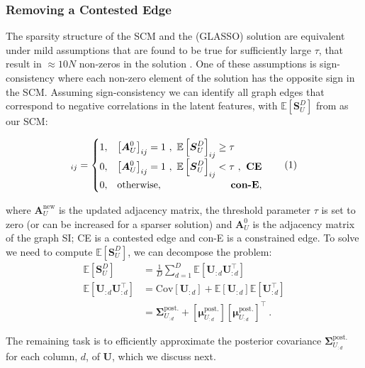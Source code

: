 \documentclass{article}
\theoremstyle{plain}
\theoremstyle{definition}
\theoremstyle{remark}
\newcommand\numberthis{\addtocounter{equation}{1}\tag{\theequation}}
\def\*#1{\boldsymbol{#1}}
\begin{document}
\subsubsection{Removing a Contested Edge}
The sparsity structure of the SCM and the (GLASSO) solution are equivalent under mild assumptions that are found to be true for sufficiently large $\tau$, that result in $\approx 10 N$ non-zeros in the solution \cite{fattahi2017graphical,fattahi2019graphical}. One of these assumptions is sign-consistency where each non-zero element of the solution has the opposite sign in the SCM. Assuming sign-consistency we can identify all graph edges that correspond to negative correlations in the latent features, with $\mathbb{E} [ \*S_U^D ]$ from  as our SCM:


\begin{equation*}
    [\*A_U^{\text{new}}]_{ij} = \begin{cases} 
    1, & \left[\*A_U^0\right]_{ij} = 1 \ , \ \mathbb{E} \left[ \*S_U^D \right]_{ij} \geq \tau \\
    0, & \left[\*A_U^0\right]_{ij} = 1 \ , \ \mathbb{E} \left[ \*S_U^D \right]_{ij} < \tau \ , \hfill \textbf{ CE}\\
    0, & \text{otherwise} , \hfill \textbf{con-E} , 
    \end{cases} \numberthis \label{eq:posCovThesh}
\end{equation*}

where $\*A_U^{\text{new}}$ is the updated adjacency matrix, the threshold parameter $\tau$ is set to zero (or can be increased for a sparser solution) and $\*A_U^0$ is the adjacency matrix of the graph SI; CE is a contested edge and con-E is a constrained edge. To solve  we need to compute $\mathbb{E} [ \*S_U^D ]$, we can decompose the problem:
\begin{align*}
 \mathbb{E}[\*S^{D}_U] &= \frac{1}{D} \sum_{d=1}^D \mathbb{E}\left[\*U_{:d} \*U_{:d}^\top \right] \\
 \mathbb{E}\left[\*U_{:d} \*U_{:d}^\top \right] &=   \text{Cov}[\*U_{:d}] + \mathbb{E}[\*U_{:d}] \mathbb{E}[\*U_{:d}^\top] \\
&= \*\Sigma_{U_{:d}}^\text{post.} + \left[\*\mu_{U_{:d}}^\text{post.}\right]\left[\*\mu_{U_{:d}}^\text{post.}\right]^\top \ .
\end{align*}

The remaining task is to efficiently approximate the posterior covariance $\*\Sigma_{U_{:d}}^\text{post.}$ for each column, $d$, of $\*U$, which we discuss next.
\end{document}
